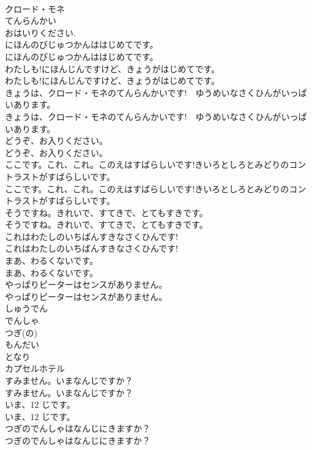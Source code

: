 \documentclass[8pt]{extreport}
\begin{document}
\begin{CJK}{UTF8}{min}
\\	クロード・モネ
\\	てんらんかい
\\	おはいりください.
\\	にほんのびじゅつかんははじめてです。	
\\	にほんのびじゅつかんははじめてです。 
\\	わたしも!にほんじんですけど、きょうがはじめてです。	
\\	わたしも!にほんじんですけど、きょうがはじめてです。 
\\	きょうは、クロード・モネのてんらんかいです!　ゆうめいなさくひんがいっぱいあります。	
\\	きょうは、クロード・モネのてんらんかいです!　ゆうめいなさくひんがいっぱいあります。 
\\	どうぞ、お入りください。	
\\	どうぞ、お入りください。 
\\	ここです。これ、これ。このえはすばらしいです!きいろとしろとみどりのコントラストがすばらしいです。	
\\	ここです。これ、これ。このえはすばらしいです!きいろとしろとみどりのコントラストがすばらしいです。 
\\	そうですね。きれいで、すてきで、とてもすきです。	
\\	そうですね。きれいで、すてきで、とてもすきです。 
\\	これはわたしのいちばんすきなさくひんです!	
\\	これはわたしのいちばんすきなさくひんです! 
\\	まあ、わるくないです。	
\\	まあ、わるくないです。 
\\	やっぱりピーターはセンスがありません。	
\\	やっぱりピーターはセンスがありません。 
\\	しゅうでん
\\	でんしゃ
\\	つぎ(の)
\\	もんだい
\\	となり
\\	カプセルホテル
\\	すみません。いまなんじですか？	
\\	すみません。いまなんじですか？ 
\\	いま、12 じです。	
\\	いま、12 じです。 
\\	つぎのでんしゃはなんじにきますか？	
\\	つぎのでんしゃはなんじにきますか？ 

\end{CJK}
\end{document}
